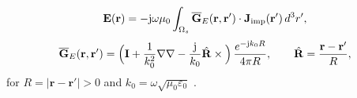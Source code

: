 \begin{equation}
\label{eq:ch2.E-from-dyadic}
\mathbf{E}(\mathbf{r})=-\mathrm{j}\omega\mu_0\int_{\Omega_s}\overline{\mathbf{G}}_{E}(\mathbf{r},\mathbf{r}')\cdot\mathbf{J}_{\mathrm{imp}}(\mathbf{r}')\,d^3r',
\end{equation}
\begin{equation}
\label{eq:ch2.dyadic-free-space}
\overline{\mathbf{G}}_{E}(\mathbf{r},\mathbf{r}')
=\Big(\mathbf{I}+\frac{1}{k_0^2}\nabla\nabla-\frac{\mathrm{j}}{k_0}\hat{\mathbf{R}}\times\Big)\,
\frac{e^{-\mathrm{j} k_0 R}}{4\pi R},
\qquad
\hat{\mathbf{R}}=\frac{\mathbf{r}-\mathbf{r}'}{R},
\end{equation}
for $R=|\mathbf{r}-\mathbf{r}'|>0$ and $k_0=\omega\sqrt{\mu_0\varepsilon_0}$ \cite{stratton1941,jackson1999}.
